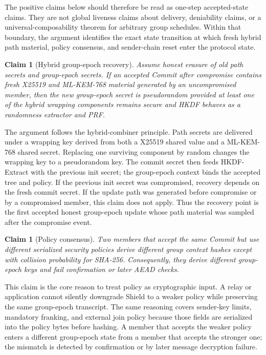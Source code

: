 \documentclass[preprint,12pt]{elsarticle}
\newtheorem{claim}[theorem]{Claim}
\theoremstyle{definition}
\newcommand{\tech}[1]{\textnormal{#1}}
\newcommand{\Shield}{\tech{Shield}}
\newcommand{\SHA}{\tech{SHA-256}}
\renewcommand{\DH}{\tech{X25519}}
\newcommand{\KEM}{\tech{ML-KEM-768}}
\begin{document}
The positive claims below should therefore be read as one-step accepted-state
claims. They are not global liveness claims about delivery, deniability claims,
or a universal-composability theorem for arbitrary group schedules. Within that
boundary, the argument identifies the exact state transition at which fresh
hybrid path material, policy consensus, and sender-chain reset enter the
protocol state.

\begin{claim}[Hybrid group-epoch recovery]
Assume honest erasure of old path secrets and group-epoch secrets. If an accepted
Commit after compromise contains fresh \DH{} and \KEM{} material generated by
an uncompromised member, then the new group-epoch secret is pseudorandom provided at
least one of the hybrid wrapping components remains secure and HKDF behaves as
a randomness extractor and PRF.
\end{claim}

\noindent
The argument follows the hybrid-combiner principle. Path secrets are delivered
under a wrapping key derived from both a \DH{} shared value and a \KEM{} shared
secret. Replacing one surviving component by random changes the wrapping key
to a pseudorandom key. The commit secret then feeds HKDF-Extract with the
previous init secret; the group-epoch context binds the accepted tree and policy.
If the previous init secret was compromised, recovery depends on the fresh
commit secret. If the update path was generated before compromise or by a
compromised member, this claim does not apply. Thus the recovery
point is the first accepted honest group-epoch update whose path material was
sampled after the compromise event.

\begin{claim}[Policy consensus]
Two members that accept the same Commit but use different serialized security
policies derive different group context hashes except with collision
probability for \SHA{}. Consequently, they derive different group-epoch keys and fail
confirmation or later AEAD checks.
\end{claim}

\noindent
This claim is the core reason to treat policy as cryptographic input. A relay
or application cannot silently downgrade \Shield{} to a weaker policy while
preserving the same group-epoch transcript.
The same reasoning covers sender-key limits, mandatory franking, and external
join policy because those fields are serialized into the policy bytes before
hashing. A member that accepts the weaker policy enters a different group-epoch
state from a member that accepts the stronger one; the mismatch is detected by
confirmation or by later message decryption failure.
\end{document}
